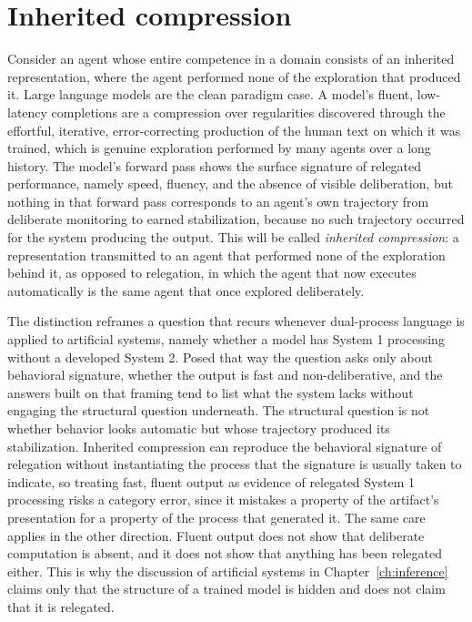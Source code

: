 \documentclass[11pt]{report}
\theoremstyle{remark}
\theoremstyle{definition}
\begin{document}
\section{Inherited compression}

Consider an agent whose entire competence in a domain consists of an inherited representation, where the agent performed none of the exploration that produced it. Large language models are the clean paradigm case. A model's fluent, low-latency completions are a compression over regularities discovered through the effortful, iterative, error-correcting production of the human text on which it was trained, which is genuine exploration performed by many agents over a long history. The model's forward pass shows the surface signature of relegated performance, namely speed, fluency, and the absence of visible deliberation, but nothing in that forward pass corresponds to an agent's own trajectory from deliberate monitoring to earned stabilization, because no such trajectory occurred for the system producing the output. This will be called \emph{inherited compression}: a representation transmitted to an agent that performed none of the exploration behind it, as opposed to relegation, in which the agent that now executes automatically is the same agent that once explored deliberately.

The distinction reframes a question that recurs whenever dual-process language is applied to artificial systems, namely whether a model has System 1 processing without a developed System 2. Posed that way the question asks only about behavioral signature, whether the output is fast and non-deliberative, and the answers built on that framing tend to list what the system lacks without engaging the structural question underneath. The structural question is not whether behavior looks automatic but whose trajectory produced its stabilization. Inherited compression can reproduce the behavioral signature of relegation without instantiating the process that the signature is usually taken to indicate, so treating fast, fluent output as evidence of relegated System 1 processing risks a category error, since it mistakes a property of the artifact's presentation for a property of the process that generated it. The same care applies in the other direction. Fluent output does not show that deliberate computation is absent, and it does not show that anything has been relegated either. This is why the discussion of artificial systems in Chapter~\ref{ch:inference} claims only that the structure of a trained model is hidden and does not claim that it is relegated.
\end{document}
